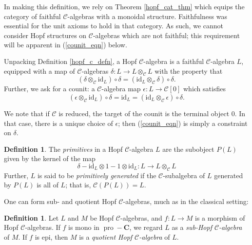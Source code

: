\documentclass[12pt]{article}
\DeclareMathOperator{\pro}{pro}
\newcommand{\CC} {\mathcal{C}}
\newcommand{\bC} {\mathbf{C}}
\newcommand{\proC}{\pro\!-\bC}
\newcommand{\id}{\mbox{id}}
\newcommand{\beqn}{\begin{equation}}
\newcommand{\eeqn}{\end{equation}}
\theoremstyle{plain}
\theoremstyle{definition}
\newtheorem{defn}[thm]{Definition}
\theoremstyle{remark}
\begin{document}
In making this definition, we rely on Theorem \ref{hopf_cat_thm} which equips the category of faithful $\CC$-algebras with a monoidal structure.  Faithfulness was essential for the unit axioms to hold in that category.  As such, we cannot consider Hopf structures on $\CC$-algebras which are not faithful; this requirement will be apparent in (\ref{counit_eqn}) below.

Unpacking Definition \ref{hopf_c_defn}, a Hopf $\CC$-algebra is a faithful $\CC$-algebra $L$, equipped with a map of $\CC$-algebras $\delta: L \to L \otimes_{\CC} L$ with the property that
%
$$(\delta \otimes_{\CC} \id_L) \circ \delta = (\id_L \otimes_{\CC} \delta) \circ \delta.$$
%
Further, we ask for a counit: a $\CC$-algebra map $\epsilon: L \to \CC[0]$ which satisfies
%
\beqn \label{counit_eqn} (\epsilon \otimes_{\CC} \id_L) \circ \delta = \id_L = (\id_L \otimes_{\CC} \epsilon) \circ \delta. \eeqn

We note that if $\CC$ is reduced, the target of the counit is the terminal object $0$.  In that case, there is a unique choice of $\epsilon$; then (\ref{counit_eqn}) is simply a constraint on $\delta$.

\begin{defn} \label{prim_C_defn} The \emph{primitives} in a Hopf $\CC$-algebra $L$ are the subobject $P(L)$ given by the kernel of the map 
%
$$\delta - \id_L \otimes 1 -1 \otimes \id_L: L \to L \otimes_{\CC} L$$
% 
Further, $L$ is said to be \emph{primitively generated} if the $\CC$-subalgebra of $L$ generated by $P(L)$ is all of $L$; that is, $\CC(P(L)) = L$. 

\end{defn}

One can form sub- and quotient Hopf $\CC$-algebras, much as in the classical setting:

\begin{defn}

Let $L$ and $M$ be Hopf $\CC$-algebras, and $f: L \to M$ is a morphism of Hopf $\CC$-algebras.  If $f$ is mono in $\proC$, we regard $L$ as a \emph{sub-Hopf $\CC$-algebra} of $M$.  If $f$ is epi, then $M$ is a \emph{quotient Hopf $\CC$-algebra} of $L$.

\end{defn}
\end{document}
